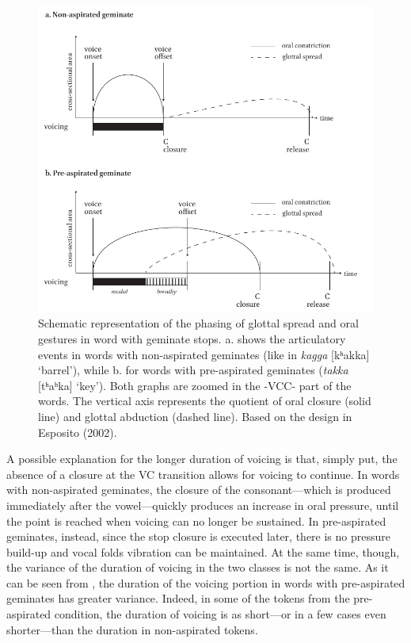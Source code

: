 \documentclass[11pt,a4paper,openany]{memoir}\usepackage[]{graphicx}\usepackage[]{color}
\begin{document}
\begin{figure}
\centering
\includegraphics[width=\textwidth]{reality}
\caption[Schematic representation of the phasing of glottal spread and oral gestures in word with geminate stops.]{Schematic representation of the phasing of glottal spread and oral gestures in word with geminate stops. a. shows the articulatory events in words with non-aspirated geminates (like in \textit{kagga} [kʰakka] `barrel'), while b. for words with pre-aspirated geminates (\textit{takka} [tʰaʰka] `key').
Both graphs are zoomed in the -VCC- part of the words.
The vertical axis represents the quotient of oral closure (solid line) and glottal abduction (dashed line).
Based on the design in Esposito (2002).}
\label{f:reality}
\end{figure}

A possible explanation for the longer duration of voicing is that, simply put, the absence of a closure at the VC transition allows for voicing to continue.
In words with non-aspirated geminates, the closure of the consonant---which is produced immediately after the vowel---quickly produces an increase in oral pressure, until the point is reached when voicing can no longer be sustained.
In pre-aspirated geminates, instead, since the stop closure is executed later, there is no pressure build-up and vocal folds vibration can be maintained.
At the same time, though, the variance of the duration of voicing in the two classes is not the same.
As it can be seen from , the duration of the voicing portion in words with pre-aspirated geminates has greater variance.
Indeed, in some of the tokens from the pre-aspirated condition, the duration of voicing is as short---or in a few cases even shorter---than the duration in non-aspirated tokens.
\end{document}
